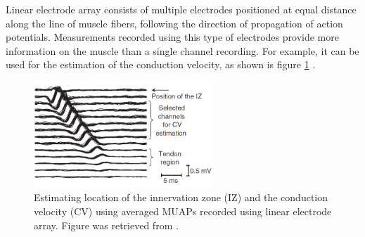 Linear electrode array consists of multiple electrodes positioned at equal distance along the line of muscle fibers, following the direction of propagation of action potentials. Measurements recorded using this type of electrodes provide more information on the muscle than a single channel recording. For example, it can be used for the estimation of the conduction velocity, as shown is figure \ref{fig:conduction_velocity} \citep{Merletti-book}.
\begin{figure}[ht]
\centering
\includegraphics[width=0.60\textwidth]{Images/introduction/conduction_velocity.png}
\caption{Estimating location of the innervation zone (IZ) and the conduction velocity (CV) using averaged MUAPs recorded using linear electrode array. Figure was retrieved from \citet{Merletti-book}.}
\label{fig:conduction_velocity}
\end{figure}

